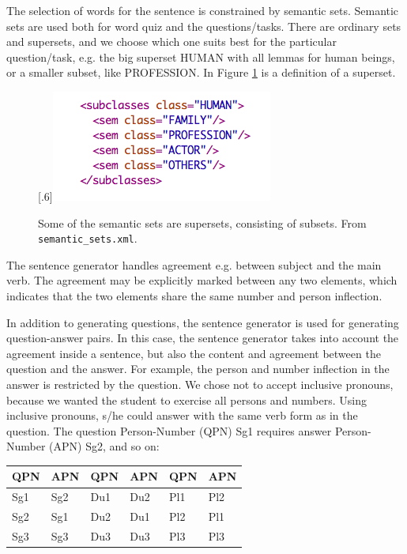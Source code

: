 \documentclass[a4paper,12pt]{article}
\begin{document}
The selection of words for the sentence is constrained by semantic sets. Semantic sets are used both for word quiz and the questions/tasks. There are ordinary sets and supersets, and we choose which one suits best for the particular question/task, e.g. the big superset HUMAN with all lemmas for human beings, or a smaller subset, like PROFESSION. In Figure \ref{semset} is a definition of a superset. 

\begin{figure}[htbp]
\begin{center}
\scalebox{.6}[.6]{\includegraphics{presentation/img/semantic_set.png}}\\
\caption{Some of the semantic sets are supersets, consisting of subsets. From \texttt{semantic\_sets.xml}.}
\label{semset}
\end{center}
\end{figure}


The sentence generator handles agreement e.g. between subject and the main verb. The agreement may be explicitly marked between any two elements, which indicates that the two elements share the same number and person inflection.

In addition to generating questions, the sentence generator is used for generating question-answer pairs. In this case, the sentence generator takes into account the agreement inside a sentence, but also the content and agreement between the question and the answer. For example, the person and number inflection in the answer is restricted by the question. We chose not to accept inclusive pronouns, because we wanted the student to exercise all persons and numbers. Using inclusive pronouns, s/he could answer with the same verb form as in the question. The question Person-Number (QPN) Sg1 requires answer Person-Number (APN) Sg2, and so on:\\

\begin{tabular}[t]{ll|ll|ll}
QPN &APN &QPN &APN &QPN &APN \\
\hline
Sg1 &Sg2 &Du1 &Du2 &Pl1 &Pl2 \\
Sg2 &Sg1 &Du2 &Du1 &Pl2 &Pl1 \\
Sg3 &Sg3 &Du3 &Du3 &Pl3 &Pl3 \\
\hline
\end{tabular}
\end{document}
